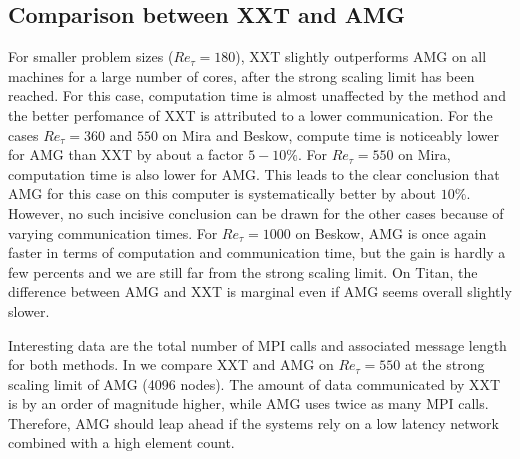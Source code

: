 \documentclass{sig-alternate}
\begin{document}
\subsection{Comparison between XXT and AMG}

For smaller problem sizes ($Re_{\tau}=180$), XXT slightly outperforms AMG on all machines
for a large number of cores, after the strong scaling limit has been reached. 
For this case, computation time is almost unaffected by the method and the better perfomance
of XXT is attributed to a lower communication. For the cases $Re_{\tau}=360$ and 
$550$ on Mira and Beskow, compute time is noticeably lower for AMG than XXT by
about a factor $5-10\%$. For $Re_{\tau}=550$ on Mira, computation time is also lower
for AMG. This leads to the clear conclusion that AMG for this case on this computer
is systematically better by about $10\%$. However, no such incisive conclusion can be drawn for the other
cases because of varying communication times. For $Re_{\tau}=1000$ on Beskow, 
AMG is once again faster in terms of computation and communication time, but the 
gain is hardly a few percents and we are still far from the strong scaling limit.
On Titan, the difference between AMG and XXT is marginal even if AMG seems overall
slightly slower.

Interesting data are the total number of MPI calls and associated message length
for both methods. In  we compare XXT and AMG on $Re_{\tau} = 550$ 
at the strong scaling limit of AMG (4096 nodes). The amount of data communicated 
by XXT is by an order of magnitude higher, while AMG uses twice as many MPI calls. 
Therefore, AMG should leap ahead if the systems rely on a low latency network 
combined with a high element count.
\end{document}

